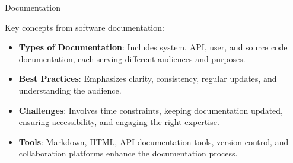 \begin{notes}{Documentation}
\begin{highlight}
    \end{highlight}
    
    \begin{highlight}
    
        Key concepts from software documentation:
        
        \begin{itemize}
            \item \textbf{Types of Documentation}: Includes system, API, user, and source code documentation, each serving different audiences and purposes.
            \item \textbf{Best Practices}: Emphasizes clarity, consistency, regular updates, and understanding the audience.
            \item \textbf{Challenges}: Involves time constraints, keeping documentation updated, ensuring accessibility, and engaging the right expertise.
            \item \textbf{Tools}: Markdown, HTML, API documentation tools, version control, and collaboration platforms enhance the documentation process.
        \end{itemize}
        
    \end{highlight}
\end{notes}
